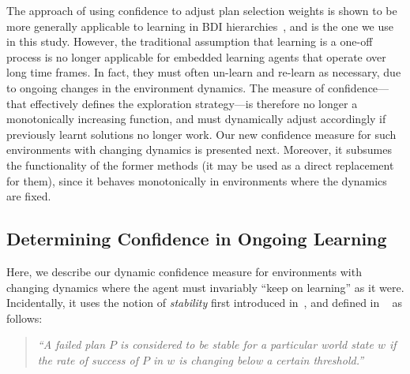 The approach of using confidence to adjust plan selection weights is shown to be more generally applicable to learning in BDI hierarchies~\cite{singh10:extending,singh10:learning}, and is the one we use in this study. However, the traditional assumption that learning is a one-off process is no longer applicable for embedded learning agents that operate over long time frames. In fact, they must often un-learn and re-learn as necessary, due to ongoing changes in the environment dynamics. The measure of confidence---that effectively defines the exploration strategy---is therefore no longer a monotonically increasing function, and must dynamically adjust accordingly if previously learnt solutions no longer work. Our new confidence measure for such environments with changing dynamics is presented next. Moreover, it subsumes the functionality of the former methods (it may be used as a direct replacement for them), since it behaves monotonically in environments where the dynamics are fixed. 

\subsection{Determining Confidence in Ongoing Learning}\label{sec:confidence}

Here, we describe our dynamic confidence measure for environments with changing dynamics where the agent must invariably ``keep on learning'' as it were. Incidentally, it uses the notion of {\em stability} first introduced in~\cite{airiau09:enhancing}, and defined in ~\cite{singh10:learning} as follows:

\begin{quote}
\emph{``A failed plan $P$ is considered to be stable for a particular world state $w$ if the rate of success of $P$ in $w$ is changing below a certain threshold.''}
\end{quote} 

\newcommand{\ds}{\zeta}
\newcommand{\app}{\mathname{app}}
\newcommand{\stable}{\mathname{stable}}

